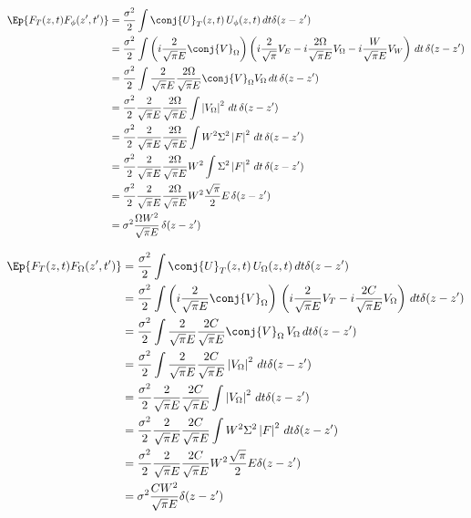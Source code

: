 \begin{equation}
\begin{split}
\Ep{F_T(z,t) F_\phi(z',t')} &= \frac{\sigma^2}{2} \int \conj{U}_T(z,t)\, U_\phi(z,t) \,dt \delta(z-z') \\
&= \frac{\sigma^2}{2} \int \left( i \frac{2}{\sqrt{\pi} E} \conj{V}_{\Omega}\right) \left( i \frac{2}{\sqrt{\pi}} V_E - i\frac{2\Omega}{\sqrt{\pi} E} V_{\Omega} -  i\frac{W}{\sqrt{\pi} E} V_W \right) \,dt \, \delta(z-z')\\
&= \frac{\sigma^2}{2} \int \frac{2}{\sqrt{\pi} E} \frac{2\Omega}{\sqrt{\pi} E} \conj{V}_{\Omega}  V_{\Omega} \,dt \, \delta(z-z')\\
&= \frac{\sigma^2}{2} \frac{2}{\sqrt{\pi} E} \frac{2\Omega}{\sqrt{\pi} E} \int  \left|V_{\Omega}\right|^2 \,dt \, \delta(z-z')\\
&= \frac{\sigma^2}{2} \frac{2}{\sqrt{\pi} E} \frac{2\Omega}{\sqrt{\pi} E} \int  W^2 \Sigma^2 \left| F\right|^2 \,dt \, \delta(z-z')\\
&= \frac{\sigma^2}{2} \frac{2}{\sqrt{\pi} E} \frac{2\Omega}{\sqrt{\pi} E}   W^2 \int\Sigma^2 \left| F\right|^2 \,dt \, \delta(z-z')\\
&= \frac{\sigma^2}{2} \frac{2}{\sqrt{\pi} E} \frac{2\Omega}{\sqrt{\pi} E}   W^2 \frac{\sqrt{\pi}}{2}E \, \delta(z-z')\\
&= \sigma^2 \frac{\Omega   W^2 }{\sqrt{\pi} E}  \, \delta(z-z')\\
\end{split}
\end{equation}

\begin{equation}
\begin{split}
\Ep{F_T(z,t) F_\Omega(z',t')} &= \frac{\sigma^2}{2} \int \conj{U}_T(z,t)\, U_\Omega(z,t) \,dt \delta(z-z') \\
&= \frac{\sigma^2}{2} \int \left( i \frac{2}{\sqrt{\pi} E} \conj{V}_{\Omega}\right) \, \left(  i \frac{2}{\sqrt{\pi}E } V_T  - i\frac{2C}{\sqrt{\pi}E }V_\Omega \right) \,dt \delta(z-z') \\
&= \frac{\sigma^2}{2} \int \frac{2}{\sqrt{\pi} E}\frac{2C}{\sqrt{\pi}E } \conj{V}_{\Omega} \, V_{\Omega}\,dt \delta(z-z') \\
&= \frac{\sigma^2}{2} \int \frac{2}{\sqrt{\pi} E}\frac{2C}{\sqrt{\pi}E } \left| V_{\Omega}\right|^2\,dt \delta(z-z') \\
&= \frac{\sigma^2}{2} \frac{2}{\sqrt{\pi} E}\frac{2C}{\sqrt{\pi}E } \int  \left| V_{\Omega}\right|^2\,dt \delta(z-z') \\
&= \frac{\sigma^2}{2} \frac{2}{\sqrt{\pi} E}\frac{2C}{\sqrt{\pi}E } \int W^2 \Sigma^2 \left| F\right|^2 \,dt \delta(z-z') \\
&= \frac{\sigma^2}{2} \frac{2}{\sqrt{\pi} E}\frac{2C}{\sqrt{\pi}E }W^2 \frac{\sqrt{\pi}}{2}E   \delta(z-z') \\
&= \sigma^2 \frac{ CW^2 }{\sqrt{\pi} E}   \delta(z-z') \\
\end{split}
\end{equation}

